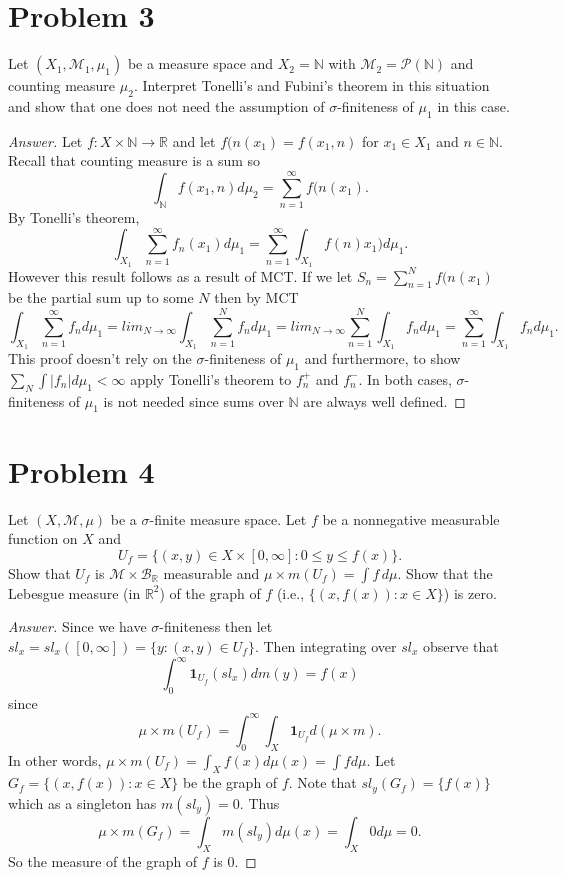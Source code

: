 \documentclass[12pt]{article}
\newcommand{\N}{\mathbb{N}}
\newcommand{\R}{\mathbb{R}}
\newenvironment{answer}{\begin{proof}[Answer]}{\end{proof}}
\begin{document}
\section*{Problem 3}
Let $(X_1, \mathcal{M}_1, \mu_1)$ be a measure space and $X_2 = \N$ with $\mathcal{M}_2 = \mathcal{P}(\N)$ and counting measure $\mu_2$. Interpret Tonelli's and Fubini's theorem in this situation and show that one does not need the assumption of $\sigma$-finiteness of $\mu_1$ in this case.

\begin{answer}
	Let $f: X\times \mathbb{N} \to \mathbb{R}$ and let $f(n(x_1) = f(x_1, n)$ for $x_1\in X_1$ and $n\in \mathbb{N}$. Recall that counting measure is a sum so
	$$\int_{\mathbb{N}}f(x_1,n)d\mu_2 = \sum_{n=1}^\infty f(n(x_1).$$
	By Tonelli's theorem,
	$$\int_{X_1} \sum_{n=1}^\infty f_n(x_1)d\mu_1 = \sum_{n=1}^\infty \int_{X_1} f(n)x_1)d\mu_1.$$ However this result follows as a result of MCT. If we let $S_n = \sum_{n=1}^N f(n(x_1)$ be the partial sum up to some $N$ then by MCT
	$$\int_{X_1} \sum_{n=1}^\infty f_n d\mu_1 = lim_{N\to \infty} \int_{X_1} \sum_{n=1}^N f_n d\mu_1 = lim_{N\to \infty}\sum_{n=1}^N \int_{X_1}f_n d\mu_1 = \sum_{n=1}^\infty \int_{X_1} f_n d\mu_1.$$
	This proof doesn't rely on the $\sigma$-finiteness of $\mu_1$ and furthermore, to show $\sum_N \int |f_n|d\mu_1 < \infty$ apply Tonelli's theorem to $f_n^+$ and $f_n^-$. In both cases, $\sigma$-finiteness of $\mu_1$ is not needed since sums over $\mathbb{N}$ are always well defined.
\end{answer}

\section*{Problem 4}
Let $(X, \mathcal{M}, \mu)$ be a $\sigma$-finite measure space. Let $f$ be a nonnegative measurable function on $X$ and
\[
	U_f = \{(x,y) \in X \times [0,\infty] : 0 \leq y \leq f(x)\}.
\]
Show that $U_f$ is $\mathcal{M} \times \mathcal{B}_{\R}$ measurable and $\mu \times m(U_f) = \int f\,d\mu$. Show that the Lebesgue measure (in $\R^2$) of the graph of $f$ (i.e., $\{(x, f(x)) : x \in X\}$) is zero.

\begin{answer}
	Since we have $\sigma$-finiteness then let $sl_x = sl_x([0,\infty]) =\{y: (x, y) \in U_f \}$. Then integrating over $sl_x$ observe that
	$$\int_0^\infty \mathbf{1}_{U_f}(sl_x)dm(y) = f(x)$$
	since $$\mu \times m(U_f) = \int_0^\infty \int_X \mathbf{1}_{U_f} d(\mu \times m).$$
	In other words, $\mu \times m(U_f) = \int_X f(x) d\mu(x) = \int f d\mu.$
	Let $G_f = \{(x, f(x)): x \in X\}$ be the graph of $f$. Note that $sl_y(G_f) = \{f(x)\}$ which as a singleton has $m(sl_y) = 0$. Thus
	$$\mu \times m(G_f) = \int_X m(sl_y)d\mu(x) = \int_X 0 d\mu = 0.$$
	So the measure of the graph of $f$ is 0.
\end{answer}
\end{document}
